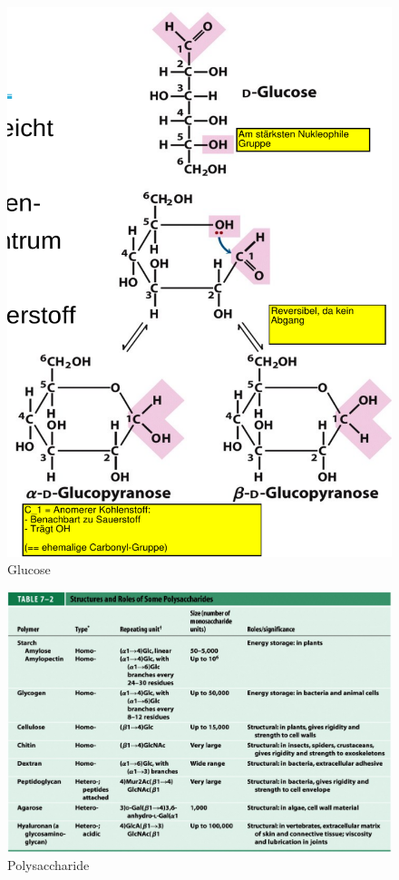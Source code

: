 \documentclass[a4paper,twocolumn,english,fontsize=7,DIV=16]{scrartcl}
\begin{document}
\begin{figure}
	\centering
	\includegraphics[width=\linewidth]{img/glucose.png}
	\caption{Glucose}
\end{figure}

\begin{figure}
	\centering
	\includegraphics[width=\linewidth]{img/polysaccharide.png}
	\caption{Polysaccharide}
\end{figure}
\end{document}
